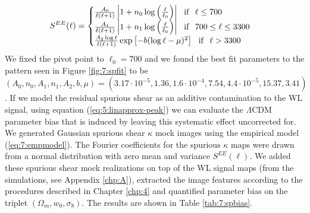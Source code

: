 \begin{equation}
\label{eq:7:empmodel}
S^{EE}(\ell) = 
\begin{cases}
\frac{A_0}{\ell(\ell+1)}\left\vert1+n_0\log\left(\frac{\ell}{\ell_0}\right)\right\vert \,\,\,\,  {\rm if } \,\,\,\, \ell\leq 700 \\
\frac{A_1}{\ell(\ell+1)}\left\vert1+n_1\log\left(\frac{\ell}{\ell_0}\right)\right\vert \,\,\,\,  {\rm if } \,\,\,\, 700\leq\ell\leq 3300 \\
\frac{A_2\log{\ell}}{\ell(\ell+1)}\exp\left[-b(\log{\ell}-\mu)^2\right] \,\,\,\,  {\rm if } \,\,\,\, \ell > 3300
\end{cases} 
\end{equation}
%
We fixed the pivot point to $\ell_0=700$ and we found the best fit parameters to the pattern seen in Figure \ref{fig:7:spfit} to be $(A_0,n_0,A_1,n_1,A_2,b,\mu)=(3.17\cdot 10^{-5},1.36,1.6\cdot 10^{-4},7.54,4.4\cdot 10^{-5},15.37,3.41)$. If we model the residual spurious shear as an additive contamination to the WL signal, using equation (\ref{eq:5:linapprox-peak}) we can evaluate the $\Lambda$CDM parameter bias that is induced by leaving this systematic effect uncorrected for. We generated Gaussian spurious shear $\kappa$ mock images using the empirical model (\ref{eq:7:empmodel}). The Fourier coefficients for the spurious $\kappa$ maps were drawn from a normal distribution with zero mean and variance $S^{EE}(\ell)$. We added these spurious shear mock realizations on top of the WL signal maps (from the  simulations, see Appendix \ref{chp:A}), extracted the image features according to the procedures described in Chapter \ref{chp:4} and quantified parameter bias on the triplet $(\Omega_m,w_0,\sigma_8)$. The results are shown in Table \ref{tab:7:spbias}.
%
